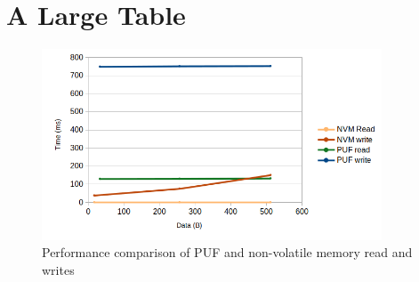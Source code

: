 \chapter{A Large Table}
\label{chapter:appendixB}

\begin{figure}[h!]
	\centering
	\includegraphics[width=0.9\textwidth]{./Images/nvm-puf-time.png}
	\caption{Performance comparison of PUF and non-volatile memory read and writes}
	\label{fig:performance:nvm-puf-time}
\end{figure}
